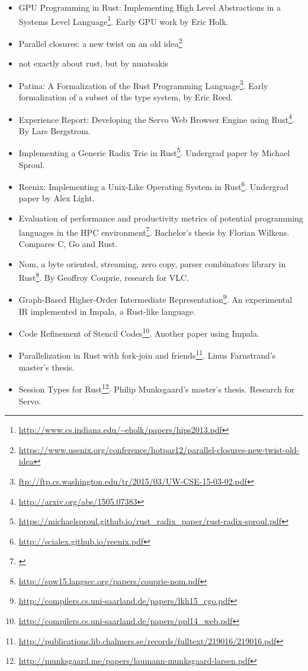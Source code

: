 \documentclass[a4paper,]{book}
\renewcommand{\href}[2]{#2\footnote{\url{#1}}}
\providecommand{\tightlist}{%
  \setlength{\itemsep}{0pt}\setlength{\parskip}{0pt}}
\begin{document}
\begin{itemize}
\tightlist
\item
  \href{http://www.cs.indiana.edu/~eholk/papers/hips2013.pdf}{GPU
  Programming in Rust: Implementing High Level Abstractions in a Systems
  Level Language}. Early GPU work by Eric Holk.
\item
  \href{https://www.usenix.org/conference/hotpar12/parallel-closures-new-twist-old-idea}{Parallel
  closures: a new twist on an old idea}
\item
  not exactly about rust, but by nmatsakis
\item
  \href{ftp://ftp.cs.washington.edu/tr/2015/03/UW-CSE-15-03-02.pdf}{Patina:
  A Formalization of the Rust Programming Language}. Early formalization
  of a subset of the type system, by Eric Reed.
\item
  \href{http://arxiv.org/abs/1505.07383}{Experience Report: Developing
  the Servo Web Browser Engine using Rust}. By Lars Bergstrom.
\item
  \href{https://michaelsproul.github.io/rust_radix_paper/rust-radix-sproul.pdf}{Implementing
  a Generic Radix Trie in Rust}. Undergrad paper by Michael Sproul.
\item
  \href{http://scialex.github.io/reenix.pdf}{Reenix: Implementing a
  Unix-Like Operating System in Rust}. Undergrad paper by Alex Light.
\item
  \href{}{Evaluation of performance and productivity metrics of
  potential programming languages in the HPC environment}. Bachelor's
  thesis by Florian Wilkens. Compares C, Go and Rust.
\item
  \href{http://spw15.langsec.org/papers/couprie-nom.pdf}{Nom, a byte
  oriented, streaming, zero copy, parser combinators library in Rust}.
  By Geoffroy Couprie, research for VLC.
\item
  \href{http://compilers.cs.uni-saarland.de/papers/lkh15_cgo.pdf}{Graph-Based
  Higher-Order Intermediate Representation}. An experimental IR
  implemented in Impala, a Rust-like language.
\item
  \href{http://compilers.cs.uni-saarland.de/papers/ppl14_web.pdf}{Code
  Refinement of Stencil Codes}. Another paper using Impala.
\item
  \href{http://publications.lib.chalmers.se/records/fulltext/219016/219016.pdf}{Parallelization
  in Rust with fork-join and friends}. Linus Farnstrand's master's
  thesis.
\item
  \href{http://munksgaard.me/papers/laumann-munksgaard-larsen.pdf}{Session
  Types for Rust}. Philip Munksgaard's master's thesis. Research for
  Servo.
\end{itemize}
\end{document}
